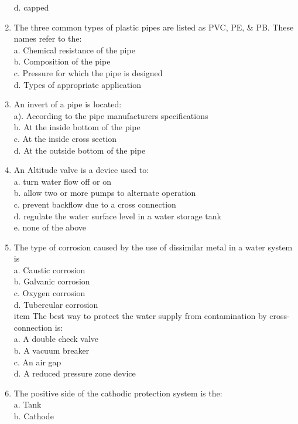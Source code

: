 \begin{enumerate}[1.]
d. capped\\
\item The three common types of plastic pipes are listed as PVC, PE, \& PB. These names refer to the:\\
a. Chemical resistance of the pipe\\
b. Composition of the pipe\\
c. Pressure for which the pipe is designed\\
d. Types of appropriate application\\
\item An invert of a pipe is located:\\
a). According to the pipe manufacturers specifications\\
b. At the inside bottom of the pipe\\
c. At the inside cross section\\
d. At the outside bottom of the pipe\\
\item An Altitude valve is a device used to:\\
a. turn water flow off or on\\
b. allow two or more pumps to alternate operation\\
c. prevent backflow due to a cross connection\\
d. regulate the water surface level in a water storage tank\\
e. none of the above\\
\item The type of corrosion caused by the use of dissimilar metal in a water system is\\
a. Caustic corrosion\\
b. Galvanic corrosion\\
c. Oxygen corrosion\\
d. Tubercular corrosion\\
item The best way to protect the water supply from contamination by cross-connection is:\\
a. A double check valve\\
b. A vacuum breaker\\
c. An air gap\\
d. A reduced pressure zone device\\
\item The positive side of the cathodic protection system is the:\\
a. Tank\\
b. Cathode\\

\end{enumerate}

